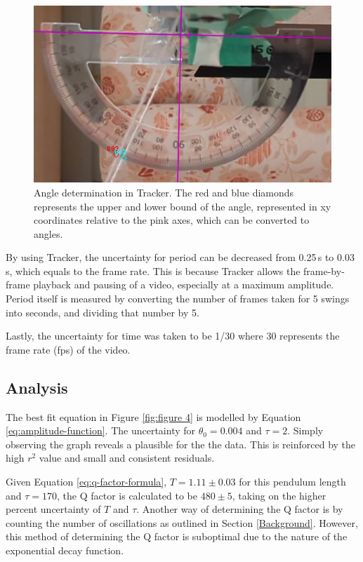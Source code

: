 \documentclass[11pt]{article}
\begin{document}
\begin{multicols}{2}
\begin{figure}[H]
    \centering
    \includegraphics[width=\linewidth]{../figures/tracker.png}
    \caption{\centering Angle determination in Tracker. The red and blue diamonds represents the upper and lower bound of the angle, represented in xy coordinates relative to the pink axes, which can be converted to angles.}
    \label{fig:figure5}
\end{figure}

By using Tracker, the uncertainty for period can be decreased from 0.25\,s to 0.03\,s, which equals to the frame rate. This is because Tracker allows the frame-by-frame playback and pausing of a video, especially at a maximum amplitude. {\color{blue}Period itself is measured by converting the number of frames taken for 5 swings into seconds, and dividing that number by 5.}

Lastly, the uncertainty for time was taken to be {\color{blue}1/30} where {\color{blue}30} represents the frame rate (fps) of the video.


\subsection{Analysis}
{\color{blue}
The best fit equation in Figure \ref{fig:figure 4} is modelled by Equation \ref{eq:amplitude-function}. The uncertainty for $\theta_0 = 0.004$ and $\tau = 2$. Simply observing the graph reveals a plausible for the the data. This is reinforced by the high $r^2$ value and small and consistent residuals.

Given Equation \ref{eq:q-factor-formula}, $T = 1.11 \pm 0.03$ for this pendulum length and $\tau = 170$, the Q factor is calculated to be $480 \pm 5$, taking on the higher percent uncertainty of $T$ and $\tau$.
Another way of determining the Q factor is by counting the number of oscillations as outlined in Section \ref{Background}. However, this method of determining the Q factor is suboptimal due to the nature of the exponential decay function.

}
\end{multicols}
\end{document}
